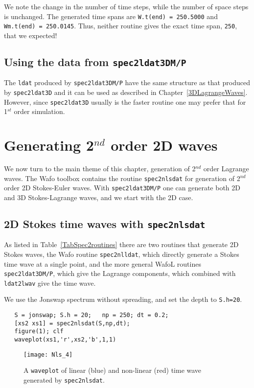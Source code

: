 \noindent
We note the change in the number of time steps, while the number of space steps is unchanged. The generated time spans are {\tt W.t(end) = 250.5000} and {\tt Wm.t(end) = 250.0145}. Thus, neither routine gives the exact time span, {\tt 250}, that we expected! 

\subsection{Using the data from {\tt spec2ldat3DM/P}}
The {\tt ldat} produced by {\tt spec2ldat3DM/P} have the same structure as that produced 
by {\tt spec2ldat3D} and it can be used as described in Chapter~\ref{3DLagrangeWaves}. However, since {\tt spec2ldat3D} usually is the faster routine one may prefer that for 1$^{st}$ order simulation.

\section{Generating 2$^{nd}$ order 2D waves}\label{s:22waves}
We now turn to the main theme of this chapter, generation of 2$^{nd}$ order Lagrange waves. The {\sc Wafo} toolbox contains the routine {\tt spec2nlsdat} for generation of 2$^{nd}$ order 2D Stokes-Euler waves.  With {\tt spec2ldat3DM/P} one can generate both 2D and 3D Stokes-Lagrange waves, and we start with the 2D case. 

\subsection{2D Stokes time waves with {\tt spec2nlsdat}}\label{ss:Stokesnlsdat}
As listed in Table~\ref{TabSpec2routines} there are two routines that generate 2D Stokes waves, the {\sc Wafo} routine {\tt spec2nlldat}, which directly generate a Stokes time wave at a single point, and the more general {\sc Wafo}L routines {\tt spec2ldat3DM/P}, which give the Lagrange components, which combined with {\tt ldat2lwav}  give the time wave.

We use the  {\sc Jonswap} spectrum without spreading, and set the depth to {\tt S.h=20}. 
{\small\begin{verbatim}
   S = jonswap; S.h = 20;   np = 250; dt = 0.2;
   [xs2 xs1] = spec2nlsdat(S,np,dt);
   figure(1); clf
   waveplot(xs1,'r',xs2,'b',1,1)
\end{verbatim}}

\begin{SCfigure}[0.8][b]
\texttt{[image: Nls\_4]}
\caption{A {\tt waveplot} of  linear (blue) and non-linear (red) time wave generated 
by {\tt spec2nlsdat}.}
\label{Fig:nls}
\end{SCfigure}

